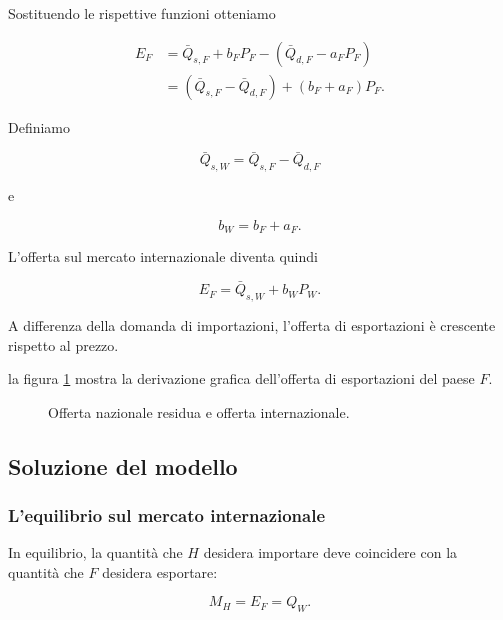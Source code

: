 Sostituendo le rispettive funzioni otteniamo

\begin{align}
    E_F
    &=
    \bar{Q}_{s,F}+b_FP_F
    -
    \left(\bar{Q}_{d,F}-a_FP_F\right)
    \\
    &=
    \left(\bar{Q}_{s,F}-\bar{Q}_{d,F}\right)
    +
    \left(b_F+a_F\right)P_F.
\end{align}

Definiamo

\begin{equation*}
    \bar{Q}_{s,W}
    =
    \bar{Q}_{s,F}-\bar{Q}_{d,F}
\end{equation*}

e

\begin{equation*}
    b_W=b_F+a_F.
\end{equation*}

L'offerta sul mercato internazionale diventa quindi

\begin{equation*}
    E_F=\bar{Q}_{s,W}+b_WP_W.
    \label{eq:offerta-mondiale}
\end{equation*}

A differenza della domanda di importazioni, l'offerta di
esportazioni è crescente rispetto al prezzo.

la figura \ref{fig:offerta_internazionale} mostra la derivazione grafica dell'offerta di esportazioni del paese $F$.

\begin{figure}[ht]
\centering

\resizebox{\linewidth}{!}{%

}
\caption{Offerta nazionale residua e offerta internazionale.}
\label{fig:offerta_internazionale}
\end{figure}


\subsection{Soluzione del modello}
\subsubsection{L'equilibrio sul mercato internazionale}

In equilibrio, la quantità che $H$ desidera importare deve
coincidere con la quantità che $F$ desidera esportare:

\begin{equation*}
    M_H=E_F=Q_W.
\end{equation*}

